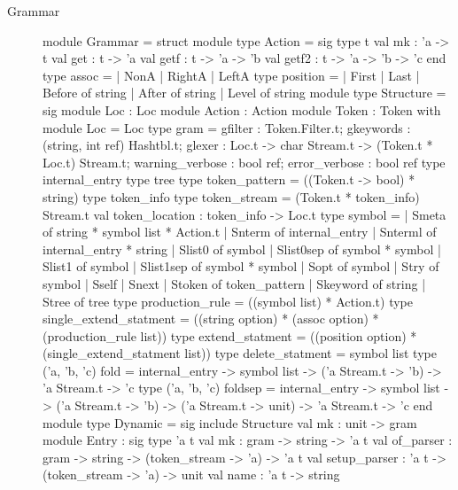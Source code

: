 \begin{description}
\item[Grammar]

  
\begin{ocamlcode}
  module Grammar =
  struct
    module type Action =
      sig
        type t
        val mk : 'a -> t
        val get : t -> 'a
        val getf : t -> 'a -> 'b
        val getf2 : t -> 'a -> 'b -> 'c
      end
    type assoc = | NonA | RightA | LeftA
    type position =
      | First | Last | Before of string | After of string | Level of string
    module type Structure =
      sig
        module Loc : Loc
        module Action : Action
        module Token : Token with module Loc = Loc
        type gram =
          { gfilter : Token.Filter.t;
            gkeywords : (string, int ref) Hashtbl.t;
            glexer : Loc.t -> char Stream.t -> (Token.t * Loc.t) Stream.t;
            warning_verbose : bool ref; error_verbose : bool ref
          }
        type internal_entry
        type tree
        type token_pattern = ((Token.t -> bool) * string)
        type token_info
        type token_stream = (Token.t * token_info) Stream.t
        val token_location : token_info -> Loc.t
        type symbol =
          | Smeta of string * symbol list * Action.t
          | Snterm of internal_entry
          | Snterml of internal_entry * string
          | Slist0 of symbol
          | Slist0sep of symbol * symbol
          | Slist1 of symbol
          | Slist1sep of symbol * symbol
          | Sopt of symbol
          | Stry of symbol
          | Sself
          | Snext
          | Stoken of token_pattern
          | Skeyword of string
          | Stree of tree
        type production_rule = ((symbol list) * Action.t)
        type single_extend_statment =
          ((string option) * (assoc option) * (production_rule list))
        type extend_statment =
          ((position option) * (single_extend_statment list))
        type delete_statment = symbol list
        type ('a, 'b, 'c) fold =
          internal_entry ->
            symbol list -> ('a Stream.t -> 'b) -> 'a Stream.t -> 'c
        type ('a, 'b, 'c) foldsep =
          internal_entry ->
            symbol list ->
              ('a Stream.t -> 'b) ->
                ('a Stream.t -> unit) -> 'a Stream.t -> 'c
      end
    module type Dynamic =
      sig
        include Structure
        val mk : unit -> gram
        module Entry :
          sig
            type 'a t
            val mk : gram -> string -> 'a t
            val of_parser : gram -> string -> (token_stream -> 'a) -> 'a t
            val setup_parser : 'a t -> (token_stream -> 'a) -> unit
            val name : 'a t -> string

\end{ocamlcode}
\end{description}
